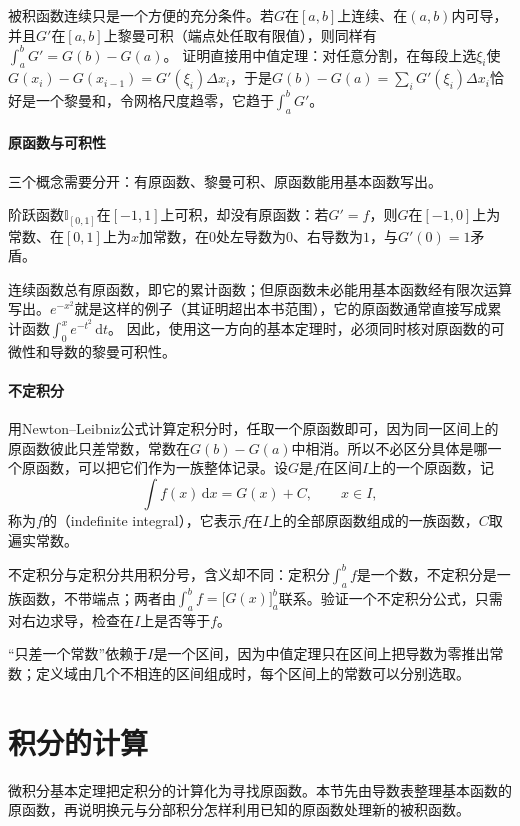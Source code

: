 被积函数连续只是一个方便的充分条件。若$G$在$[a,b]$上连续、在$(a,b)$内可导，并且$G'$在$[a,b]$上黎曼可积（端点处任取有限值），则同样有$\int_a^bG'=G(b)-G(a)$。
证明直接用中值定理：对任意分割，在每段上选$\xi_i$使$G(x_i)-G(x_{i-1})=G'(\xi_i)\Delta x_i$，于是$G(b)-G(a)=\sum_iG'(\xi_i)\Delta x_i$恰好是一个黎曼和，令网格尺度趋零，它趋于$\int_a^bG'$。

\paragraph{原函数与可积性}
三个概念需要分开：有原函数、黎曼可积、原函数能用基本函数写出。
\begin{example}[可积而没有原函数的阶跃函数]
\label{ex:ru-step-no-antiderivative}
阶跃函数$\mathbb I_{[0,1]}$在$[-1,1]$上可积，却没有原函数：若$G'=f$，则$G$在$[-1,0]$上为常数、在$[0,1]$上为$x$加常数，在$0$处左导数为$0$、右导数为$1$，与$G'(0)=1$矛盾。
\end{example}
连续函数总有原函数，即它的累计函数；但原函数未必能用基本函数经有限次运算写出。$e^{-x^2}$就是这样的例子（其证明超出本书范围），它的原函数通常直接写成累计函数$\int_0^xe^{-t^2}\,\mathrm dt$。
因此，使用这一方向的基本定理时，必须同时核对原函数的可微性和导数的黎曼可积性。

\paragraph{不定积分}
用Newton--Leibniz公式计算定积分时，任取一个原函数即可，因为同一区间上的原函数彼此只差常数，常数在$G(b)-G(a)$中相消。所以不必区分具体是哪一个原函数，可以把它们作为一族整体记录。设$G$是$f$在区间$I$上的一个原函数，记
\[
 \int f(x)\,\mathrm dx=G(x)+C,\qquad x\in I,
\]
称为$f$的（indefinite integral），它表示$f$在$I$上的全部原函数组成的一族函数，$C$取遍实常数。

不定积分与定积分共用积分号，含义却不同：定积分$\int_a^bf$是一个数，不定积分是一族函数，不带端点；两者由$\int_a^bf=\bigl[G(x)\bigr]_a^b$联系。验证一个不定积分公式，只需对右边求导，检查在$I$上是否等于$f$。

“只差一个常数”依赖于$I$是一个区间，因为中值定理只在区间上把导数为零推出常数；定义域由几个不相连的区间组成时，每个区间上的常数可以分别选取。
\section{积分的计算}
\label{sec:ru-integration-methods}

微积分基本定理把定积分的计算化为寻找原函数。本节先由导数表整理基本函数的原函数，再说明换元与分部积分怎样利用已知的原函数处理新的被积函数。

